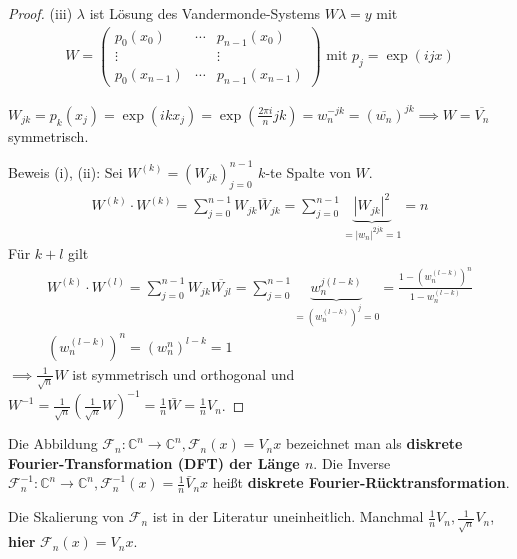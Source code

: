 \begin{proof}
	(iii) $\lambda$ ist Lösung des Vandermonde-Systems $W\lambda = y$ mit
	\begin{align*}
		W = \left(\begin{matrix}
			p_0(x_0) & \cdots & p_{n-1}(x_0)\\
			\vdots & & \vdots\\
			p_0(x_{n-1}) & \cdots & p_{n-1}(x_{n-1})
		\end{matrix}\right) \text{ mit } p_j = \exp(ijx)
	\end{align*}
	
	$W_{jk} = p_k(x_j) = \exp(ikx_j) = \exp\left(\frac{2\pi i}{n} jk\right) = w_n^{-jk} = (\overline{w_n})^{jk} \implies W = \overline{V_n}$ symmetrisch.
	
	Beweis (i), (ii): Sei $W^{(k)} = (W_{jk})_{j=0}^{n-1}$ $k$-te Spalte von $W$.
	\begin{align*}
		W^{(k)} \cdot W^{(k)} = \sum_{j=0}^{n-1} W_{jk} \overline{W}_{jk} = \sum_{j=0}^{n-1} \underbrace{|W_{jk}|^2}_{=|w_n|^{2jk}=1} = n
	\end{align*}
	Für $k+l$ gilt
	\begin{align*}
		W^{(k)} \cdot W^{(l)} = \sum_{j=0}^{n-1} W_{jk} \overline{W_{jl}} = \sum_{j=0}^{n-1} \underbrace{w_n^{j(l-k)}}_{=(w_n^{(l-k)})^j=0} = \frac{1-(w_n^{(l-k)})^n}{1-w_n^{(l-k)}}\\
		(w_n^{(l-k)})^n = (w_n^n)^{l-k} = 1
	\end{align*}
	$\implies \frac{1}{\sqrt{n}}W$ ist symmetrisch und orthogonal und $W^{-1} = \frac{1}{\sqrt{n}} \left(\frac{1}{\sqrt{n}}W\right)^{-1} = \frac{1}{n} \bar{W} = \frac{1}{n} V_n$.
\end{proof}

\begin{definition}
	Die Abbildung $\mathcal{F}_n:\mathbb{C}^n \rightarrow \mathbb{C}^n, \mathcal{F}_n(x) = V_n x$ bezeichnet man als \textbf{diskrete Fourier-Transformation (DFT) der Länge $n$}. Die Inverse $\mathcal{F}_n^{-1}: \mathbb{C}^n \rightarrow \mathbb{C}^n, \mathcal{F}_n^{-1}(x) = \frac{1}{n}\bar{V}_nx$ heißt \textbf{diskrete Fourier-Rücktransformation}.
\end{definition}

\begin{remark}
	Die Skalierung von $\mathcal{F}_n$ ist in der Literatur uneinheitlich. Manchmal $\frac{1}{n}V_n, \frac{1}{\sqrt{n}}V_n$, \textbf{hier} $\mathcal{F}_n(x) = V_n x$.
\end{remark}

